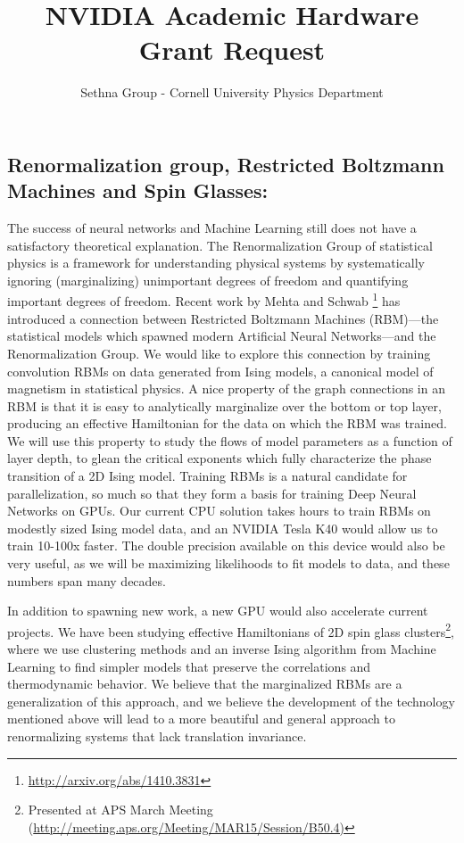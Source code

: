 \documentclass[12pt,pdf,singlespace]{article}
\title{NVIDIA Academic Hardware Grant Request}
\author{Sethna Group - Cornell University Physics Department}
\date{}
\begin{document}
\maketitle
\vspace{-2cm}
\subsection*{Renormalization group, Restricted Boltzmann Machines and Spin Glasses:}

The success of neural networks and Machine Learning still does not have a satisfactory theoretical explanation. The Renormalization Group of statistical physics is a framework for understanding physical systems by systematically ignoring (marginalizing) unimportant degrees of freedom and quantifying important degrees of freedom. Recent work by Mehta and Schwab \footnote{\url{http://arxiv.org/abs/1410.3831}} has introduced a connection between Restricted Boltzmann Machines (RBM)---the statistical models which spawned modern Artificial Neural Networks---and the Renormalization Group. We would like to explore this connection by training convolution RBMs on data generated from Ising models, a canonical model of magnetism in statistical physics. A nice property of the graph connections in an RBM is that it is easy to analytically marginalize over the bottom or top layer, producing an effective Hamiltonian for the data on which the RBM was trained. We will use this property to study the flows of model parameters as a function of layer depth, to glean the critical exponents which fully characterize the phase transition of a 2D Ising model. Training RBMs is a natural candidate for parallelization, so much so that they form a basis for training Deep Neural Networks on GPUs. Our current CPU solution takes hours to train RBMs on modestly sized Ising model data, and an NVIDIA Tesla K40 would allow us to train 10-100x faster. The double precision available on this device would also be very useful, as we will be maximizing likelihoods to fit models to data, and these numbers span many decades.

In addition to spawning new work, a new GPU would also accelerate current projects. We have been studying effective Hamiltonians of 2D spin glass clusters\footnote{Presented at APS March Meeting (\url{http://meeting.aps.org/Meeting/MAR15/Session/B50.4)}}, where we use clustering methods and an inverse Ising algorithm from Machine Learning to find simpler models that preserve the correlations and thermodynamic behavior. We believe that the marginalized RBMs are a generalization of this approach, and we believe the development of the technology mentioned above will lead to a more beautiful and general approach to renormalizing systems that lack translation invariance. 
\end{document}
